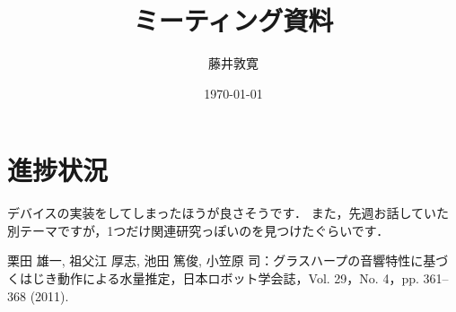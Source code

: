 \documentclass[a4j,10pt]{jarticle}
\title{ミーティング資料}
\author{藤井敦寛}
\date{\today}
\begin{document}
\maketitle

\section{進捗状況}
デバイスの実装をしてしまったほうが良さそうです．
また，先週お話していた別テーマですが，1つだけ関連研究っぽいのを見つけたぐらいです．

\begin{thebibliography}{2}
   栗田 雄一, 祖父江 厚志, 池田 篤俊, 小笠原 司：グラスハープの音響特性に基づくはじき動作による水量推定，日本ロボット学会誌，Vol. 29，No. 4，pp. 361--368 (2011).
\end{thebibliography}





\end{document}

